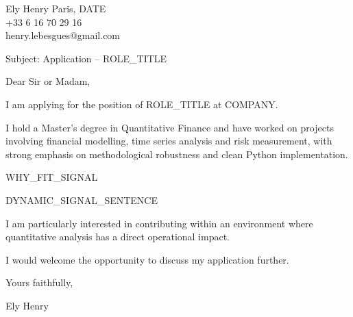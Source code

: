 \documentclass[10pt,a4paper]{article}
\begin{document}
\noindent Ely Henry \hfill Paris, {{DATE}} \\
+33 6 16 70 29 16 \\
henry.lebesgues@gmail.com \\

\vspace{1cm}

\noindent Subject: Application – {{ROLE_TITLE}}

\vspace{0.5cm}

Dear Sir or Madam,

\vspace{0.5cm}

I am applying for the position of {{ROLE_TITLE}} at {{COMPANY}}.

I hold a Master’s degree in Quantitative Finance and have worked on projects involving financial modelling, time series analysis and risk measurement, with strong emphasis on methodological robustness and clean Python implementation.

{{WHY_FIT_SIGNAL}}

{{DYNAMIC_SIGNAL_SENTENCE}}

I am particularly interested in contributing within an environment where quantitative analysis has a direct operational impact.

I would welcome the opportunity to discuss my application further.

Yours faithfully,

\vspace{1cm}

\noindent Ely Henry
\end{document}

